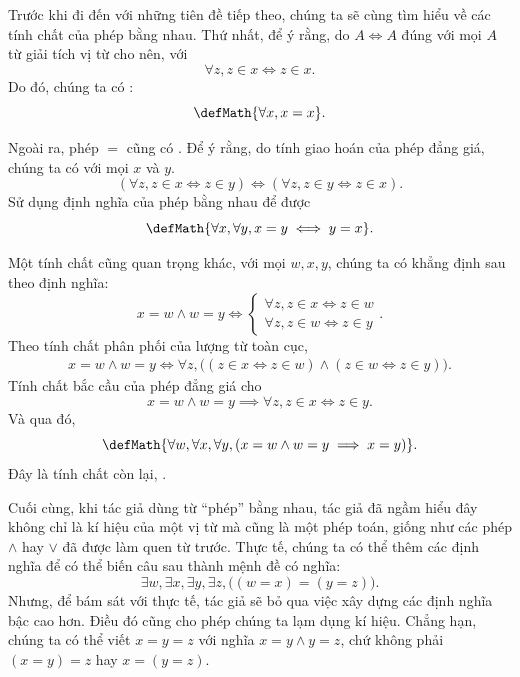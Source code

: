 Trước khi đi đến với những tiên đề tiếp theo, chúng ta sẽ cùng tìm hiểu về các tính chất của phép bằng nhau. Thứ nhất, để ý rằng, do $A \iff A$ đúng với mọi $A$ từ giải tích vị từ cho nên, với
\begin{equation*}
    \forall z, z \in x \iff z \in x.
\end{equation*}
Do đó, chúng ta có :
\begin{equation*}
    \defMath{\forall x, x = x}.
\end{equation*}

Ngoài ra, phép $=$ cũng có . Để ý rằng, do tính giao hoán của phép đẳng giá, chúng ta có với mọi $x$ và $y$.
\begin{equation*}
    (\forall z, z \in x \iff z \in y) \iff (\forall z, z \in y \iff z \in x).
\end{equation*}
Sử dụng định nghĩa của phép bằng nhau để được
\begin{equation*}
    \defMath{\forall x, \forall y, x = y \iff y = x}.
\end{equation*}

Một tính chất cũng quan trọng khác, với mọi $w, x, y$, chúng ta có khẳng định sau theo định nghĩa:
\begin{equation*}
    x = w \land w = y \iff \begin{cases}
        \forall z, z \in x \iff z \in w \\
        \forall z, z \in w \iff z \in y
    \end{cases}.
\end{equation*}
Theo tính chất phân phối của lượng từ toàn cục,
\begin{align*}
    x = w \land w = y \iff\forall z, \big((z \in x \iff z \in w) \land (z \in w \iff z \in y)\big).
\end{align*}
Tính chất bắc cầu của phép đẳng giá cho
\begin{equation*}
    x = w \land w = y \implies \forall z, z \in x \iff z \in y.
\end{equation*}
Và qua đó,
\begin{equation*}
    \defMath{\forall w, \forall x, \forall y, \left( x = w \land w = y \implies x = y \right)}.
\end{equation*}
Đây là tính chất còn lại, .

Cuối cùng, khi tác giả dùng từ ``phép'' bằng nhau, tác giả đã ngầm hiểu đây không chỉ là kí hiệu của một vị từ mà cũng là một phép toán, giống như các phép $\land$ hay $\lor$ đã được làm quen từ trước. Thực tế, chúng ta có thể thêm các định nghĩa để có thể biến câu sau thành mệnh đề có nghĩa:
\begin{equation*}
    \exists w, \exists x, \exists y, \exists z, \big((w = x) = (y = z)\big).
\end{equation*}
Nhưng, để bám sát với thực tế, tác giả sẽ bỏ qua việc xây dựng các định nghĩa bậc cao hơn. Điều đó cũng cho phép chúng ta lạm dụng kí hiệu. Chẳng hạn, chúng ta có thể viết $x = y = z$ với nghĩa $x = y \land y = z$, chứ không phải $(x = y) = z$ hay $x = (y = z)$.

